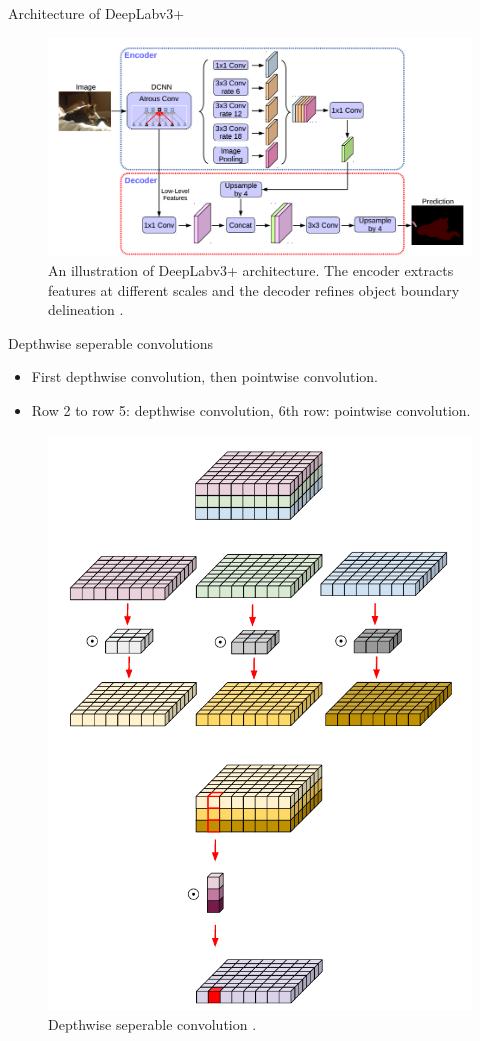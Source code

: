 \documentclass{beamer}
\begin{document}
\begin{frame}{Architecture of DeepLabv3+}
	
	\begin{figure}
		\centering
		\includegraphics[width=1\linewidth]{images/deepLabv4}
		\captionsetup{justification=centering,margin=0.2cm}
		\caption{An illustration of DeepLabv3+ architecture. The encoder extracts features at different scales and the decoder refines object boundary delineation \cite{DBLP:journals/corr/abs-1802-02611}.}
		\label{Fig:deepLabv4}
	\end{figure}

\end{frame}


\begin{frame}{Depthwise seperable convolutions}
	\begin{small}
	\begin{itemize}
		\item First depthwise convolution, then pointwise convolution.
		\item Row 2 to row 5: depthwise convolution, 6th row: pointwise convolution.
	\end{itemize}
	\end{small}
	 
	\begin{figure}
		\centering
		\includegraphics[width=.3\linewidth]{images/depthwise}
		\captionsetup{justification=centering,margin=0.2cm}
		\caption{Depthwise seperable convolution \cite{depthwise}.}
		\label{Fig:depthwise}
	\end{figure}

\end{frame}
\end{document}

